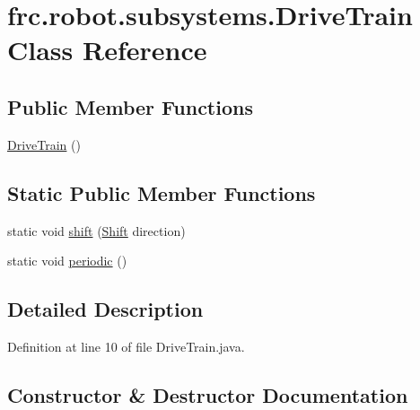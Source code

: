 \hypertarget{classfrc_1_1robot_1_1subsystems_1_1_drive_train}{}\section{frc.\+robot.\+subsystems.\+Drive\+Train Class Reference}
\label{classfrc_1_1robot_1_1subsystems_1_1_drive_train}
\subsection*{Public Member Functions}
\begin{DoxyCompactItemize}
\item 
\hyperlink{classfrc_1_1robot_1_1subsystems_1_1_drive_train_a39f30717e8df92af73d57c01ac0525df}{Drive\+Train} ()
\end{DoxyCompactItemize}
\subsection*{Static Public Member Functions}
\begin{DoxyCompactItemize}
\item 
static void \hyperlink{classfrc_1_1robot_1_1subsystems_1_1_drive_train_a3288b5af8182d08f76290b257041538c}{shift} (\hyperlink{enumfrc_1_1robot_1_1_enums_1_1_shift}{Shift} direction)
\item 
static void \hyperlink{classfrc_1_1robot_1_1subsystems_1_1_drive_train_a883baac3715e22887c0ec5ce825fbfab}{periodic} ()
\end{DoxyCompactItemize}


\subsection{Detailed Description}


Definition at line 10 of file Drive\+Train.\+java.



\subsection{Constructor \& Destructor Documentation}
\mbox{\label{classfrc_1_1robot_1_1subsystems_1_1_drive_train_a39f30717e8df92af73d57c01ac0525df}} 

